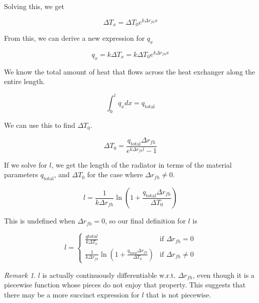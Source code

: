 \documentclass{article}
\numberwithin{equation}{subsection}
\theoremstyle{remark}
\newtheorem*{remark}{Remark}
\newcommand{\qtotal}{q_{\mathrm{total}}}
\newcommand{\DeltaT}{\Delta{}T}
\newcommand{\Deltarfh}{\Delta{}r_{fh}}
\begin{document}
Solving this, we get

\begin{equation}
\DeltaT_{x} = \DeltaT_{0} e^{k \Deltarfh x}
\end{equation}

From this, we can derive a new expression for \(q_{x}\)

\begin{equation}
q_{x} = k \DeltaT_{x} = k \DeltaT_{0} e^{k \Deltarfh x}
\end{equation}

We know the total amount of heat that flows across the heat exchanger along the entire length.

\begin{equation}
\int_{0}^{l} q_{x} dx = \qtotal
\end{equation}

We can use this to find \(\DeltaT_{0}\).

\begin{equation}
\DeltaT_{0} = \frac{\qtotal \Deltarfh}{e^{k \Deltarfh l} - 1}
\end{equation}

If we solve for \(l\), we get the length of the radiator in terms of the material parameters \(\qtotal\), and \(\DeltaT_{0}\) for the case where \(\Deltarfh \ne 0\).

\begin{equation}
l = \frac{1}{k \Deltarfh} \ln \left(1 + \frac{\qtotal \Deltarfh}{\DeltaT_{0}}\right)
\end{equation}

This is undefined when \(\Deltarfh = 0\), so our final definition for \(l\) is

\begin{equation}
\label{eqn:counterflow_l}
l =
\begin{cases}
	\frac{qtotal}{k \DeltaT_{0}} & \text{if } \Deltarfh = 0 \\
	\frac{1}{k \Deltarfh} \ln \left(1 + \frac{\qtotal \Deltarfh}{\DeltaT_{0}}\right) & \text{if } \Deltarfh \ne 0
\end{cases}
\end{equation}

\begin{remark}
\(l\) is actually continuously differentiable w.r.t. \(\Deltarfh\), even though it is a piecewise function whose pieces do not enjoy that property.
This suggests that there may be a more succinct expression for \(l\) that is not piecewise.
\end{remark}
\end{document}
